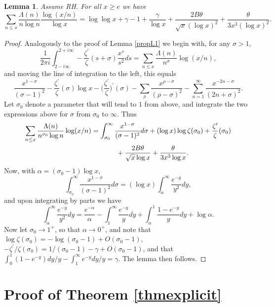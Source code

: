 \documentclass [12pt]{amsart}
\newtheorem{lemma}{Lemma}[section]
\numberwithin{equation}{section}
\begin{document}
 \begin{lemma}
 \label{lem6}  Assume RH.  For all $x\ge e$ we have 
 $$ 
 \sum_{n\le x} \frac{\Lambda(n)}{n\log n} \frac{\log (x/n)}{\log x} = 
 \log \log x + \gamma - 1 +\frac{\gamma}{\log x} +\frac{2B\theta}{\sqrt{x}(\log x)^2} 
 + \frac{\theta}{3x^3 (\log x)^2}. 
 $$ 
 \end{lemma}
 \begin{proof}  Analogously to the proof of Lemma \ref{propL1} we begin with, for any 
 $\sigma>1$, 
 $$ 
 \frac{1}{2\pi i} \int_{2-i\infty}^{2+i\infty} -\frac{\zeta^{\prime}}{\zeta}(s+\sigma)\frac{x^{s}}{s^2} ds 
 = \sum_{n\le x} \frac{\Lambda(n)}{n^{\sigma}} \log (x/n), 
 $$ 
 and moving the line of integration to the left, this equals 
 $$ 
 \frac{x^{1-\sigma}}{(\sigma-1)^2} - \frac{\zeta^{\prime}}{\zeta}(\sigma)\log x 
 - \Big(\frac{\zeta^{\prime}}{\zeta}\Big)^{\prime} (\sigma) - \sum_{\rho} \frac{x^{\rho-\sigma}}{(\rho-\sigma)^2} - \sum_{n=1}^{\infty} \frac{x^{-2n-\sigma}}{(2n+\sigma)^2}. 
 $$  
 Let $\sigma_0$ denote a parameter that will tend to $1$ from above, and integrate the two 
 expressions above for $\sigma$ from $\sigma_0$ to $\infty$.  Thus 
 \begin{align*}
 \sum_{n\le x }\frac{\Lambda(n)}{n^{\sigma_0} \log n} \log(x/n) 
& = \int_{\sigma_0}^{\infty} \frac{x^{1-\sigma}}{(\sigma-1)^2}d\sigma + (\log x) \log \zeta(\sigma_0) 
 + \frac{\zeta^{\prime}}{\zeta}(\sigma_0) \\
 &\hskip .5 in + \frac{2B\theta}{\sqrt{x} \log x} + 
 \frac{\theta}{3x^3 \log x}.
 \end{align*}
 Now, with $\alpha= (\sigma_0-1) \log x$, 
 $$ 
 \int_{\sigma_0}^{\infty} \frac{x^{1-\sigma}}{(\sigma-1)^2} d\sigma 
 = (\log x) \int_{\alpha}^{\infty} \frac{e^{-y}}{y^2} dy, 
 $$ 
 and upon integrating by parts we have 
 $$ 
 \int_\alpha^{\infty} \frac{e^{-y}}{y^2} dy = \frac{e^{-\alpha}}{\alpha} - \int_1^{\infty} 
 \frac{e^{-y}}{y} dy + \int_{\alpha}^{1} \frac{1-e^{-y}}{y} dy + \log \alpha.
 $$
 Now let $\sigma_0 \to 1^+$, so that $\alpha \to 0^+$, and 
 note that $\log \zeta(\sigma_0) = - \log (\sigma_0-1) + O(\sigma_0-1)$, 
$-\zeta^{\prime}/\zeta(\sigma_0) = 1/(\sigma_0-1) - \gamma +O(\sigma_0-1)$, 
and that $\int_0^{1} (1-e^{-y})dy/y -\int_1^{\infty} e^{-y} dy/y = \gamma$.  The 
lemma then follows.
 \end{proof} 
 
 
\section{Proof of Theorem \ref{thmexplicit}}
\end{document}
